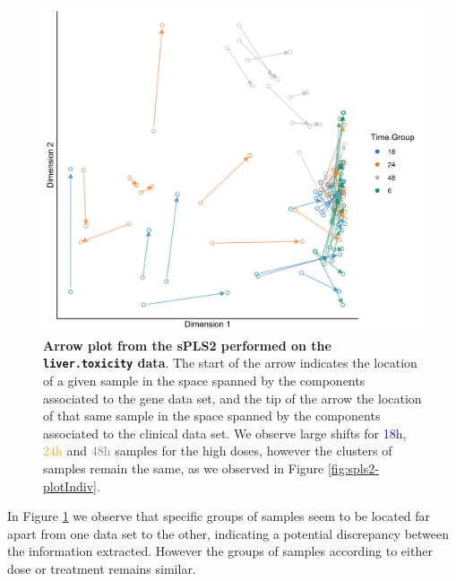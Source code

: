 \documentclass[]{book}
\newenvironment{Shaded}{\begin{snugshade}}{\end{snugshade}}
\newcommand{\KeywordTok}[1]{\textcolor[rgb]{0.13,0.29,0.53}{\textbf{#1}}}
\newcommand{\DataTypeTok}[1]{\textcolor[rgb]{0.13,0.29,0.53}{#1}}
\newcommand{\DecValTok}[1]{\textcolor[rgb]{0.00,0.00,0.81}{#1}}
\newcommand{\StringTok}[1]{\textcolor[rgb]{0.31,0.60,0.02}{#1}}
\newcommand{\OtherTok}[1]{\textcolor[rgb]{0.56,0.35,0.01}{#1}}
\newcommand{\OperatorTok}[1]{\textcolor[rgb]{0.81,0.36,0.00}{\textbf{#1}}}
\newcommand{\NormalTok}[1]{#1}
\begin{document}
\begin{Shaded}
\end{Shaded}

\begin{figure}

{\centering \includegraphics[width=0.5\linewidth]{Figures/PLS/spls2-plotArrow-1} 

}

\caption{\textbf{Arrow plot from the sPLS2 performed on the
\texttt{liver.toxicity} data}. The start of the arrow indicates the
location of a given sample in the space spanned by the components
associated to the gene data set, and the tip of the arrow the location
of that same sample in the space spanned by the components associated to
the clinical data set. We observe large shifts for
\textcolor{blue}{18h}, \textcolor{orange}{24h} and \textcolor{grey}{48h}
samples for the high doses, however the clusters of samples remain the
same, as we observed in Figure \ref{fig:spls2-plotIndiv}.}\label{fig:spls2-plotArrow}
\end{figure}











In Figure \ref{fig:spls2-plotArrow} we observe that specific groups of
samples seem to be located far apart from one data set to the other,
indicating a potential discrepancy between the information extracted.
However the groups of samples according to either dose or treatment
remains similar.
\end{document}
